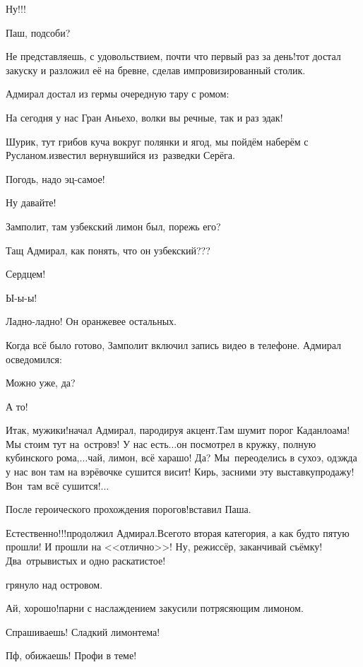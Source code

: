 \diagdash Ну!!!

\diagdash Паш, подсоби?

\diagdash Не представляешь, с удовольствием, почти что первый раз за день!\mdash тот достал закуску и разложил её на бревне, сделав импровизированный столик.

Адмирал достал из гермы очередную тару с ромом:

\diagdash На сегодня у нас Гран Аньехо, волки вы речные, так и раз эдак!

\diagdash Шурик, тут грибов куча вокруг полянки и ягод, мы пойдём наберём с Русланом.\mdash известил вернувшийся из~разведки Серёга.

\diagdash Погодь, надо эц-самое!

\diagdash Ну давайте!

\diagdash Замполит, там узбекский лимон был, порежь его?

\diagdash Тащ Адмирал, как понять, что он узбекский???

\diagdash Сердцем!

\diagdash Ы-ы-ы!

\diagdash Ладно-ладно! Он оранжевее остальных.

Когда всё было готово, Замполит включил запись видео в телефоне. Адмирал осведомился:

\diagdash Можно уже, да?

\diagdash А то!

\diagdash Итак, мужики!\mdash начал Адмирал, пародируя акцент.\mdash Там шумит порог Каданлоама! Мы стоим тут на~островэ! У нас есть$\ldots$\mdash он посмотрел в кружку, полную кубинского рома,\mdash $\ldots$чай, лимон, всё харашо! Да? Мы~переоделись в сухоэ, одэжда у нас вон там на вэрёвочке сушится висит! Кирь, засними эту выставку\sdash продажу! Вон~там всё сушится!$\ldots$

\diagdash После героического прохождения порогов!\mdash вставил Паша.

\diagdash Естественно!!!\mdash продолжил Адмирал.\mdash Всего\sdash то вторая категория, а как будто пятую прошли! И прошли на <<отлично>>! Ну, режиссёр, заканчивай съёмку! Два~отрывистых и одно раскатистое!

\mdash грянуло над островом.

\diagdash Ай, хорошо!\mdash парни с наслаждением закусили потрясяющим лимоном.

\diagdash Спрашиваешь! Сладкий лимон\mdash тема!

\diagdash Пф, обижаешь! Профи в теме!

